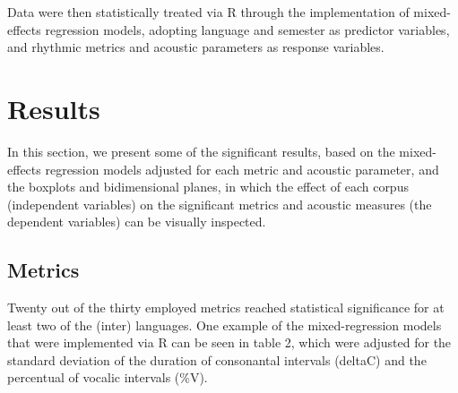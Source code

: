 
Data were then statistically treated via R \citep{r20210}%
through the implementation of mixed-effects regression models, adopting language and
semester as predictor variables, and rhythmic metrics and acoustic parameters
as response variables.

\section{Results}
In this section, we present some of the significant results, based on the
mixed-effects regression models adjusted for each metric and acoustic
parameter, and the boxplots and bidimensional planes, in which the effect of
each corpus (independent variables) on the significant metrics and acoustic
measures (the dependent variables) can be visually inspected.

\subsection{Metrics}
Twenty out of the thirty employed metrics reached statistical significance for
at least two of the (inter) languages. One example of the mixed-regression
models that were implemented via R can be seen in table 2, which were adjusted
for the standard deviation of the duration of consonantal intervals (deltaC)
and the percentual of vocalic intervals (\%V).

